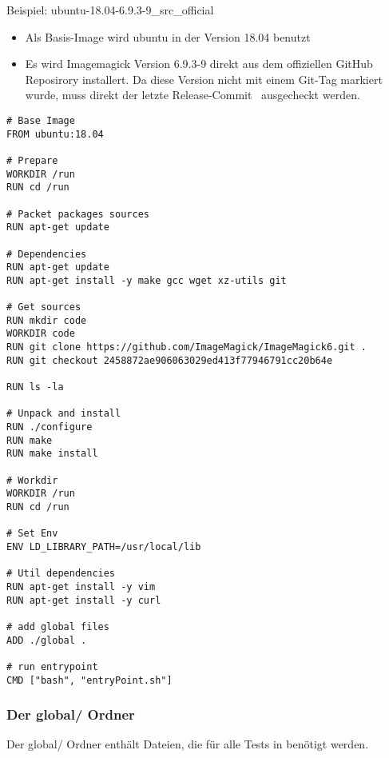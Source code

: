 \newpage

Beispiel: ubuntu-18.04-6.9.3-9\_src\_official

\begin{itemize}[\itemsep=1em]
    \item Als Basis-Image wird ubuntu in der Version 18.04 benutzt
    \item Es wird Imagemagick Version 6.9.3-9 direkt aus dem offiziellen GitHub Reposirory installert.
    Da diese Version nicht mit einem Git-Tag markiert wurde,
    muss direkt der letzte Release-Commit~\cite{ReleaseImageMagick393-9} ausgecheckt werden.
\end{itemize}

\begin{lstlisting}[language=Docker, caption=Beispiel Dockerfile aus der Testsuite,label={lst:testsuiteexample}]
# Base Image
FROM ubuntu:18.04

# Prepare
WORKDIR /run
RUN cd /run

# Packet packages sources
RUN apt-get update

# Dependencies
RUN apt-get update
RUN apt-get install -y make gcc wget xz-utils git

# Get sources
RUN mkdir code
WORKDIR code
RUN git clone https://github.com/ImageMagick/ImageMagick6.git .
RUN git checkout 2458872ae906063029ed413f77946791cc20b64e

RUN ls -la

# Unpack and install
RUN ./configure
RUN make
RUN make install

# Workdir
WORKDIR /run
RUN cd /run

# Set Env
ENV LD_LIBRARY_PATH=/usr/local/lib

# Util dependencies
RUN apt-get install -y vim
RUN apt-get install -y curl

# add global files
ADD ./global .

# run entrypoint
CMD ["bash", "entryPoint.sh"]
\end{lstlisting}
\vspace{5mm}

\newpage

\subsubsection{Der global/ Ordner}

Der global/ Ordner enthält Dateien, die für alle Tests in benötigt werden.


